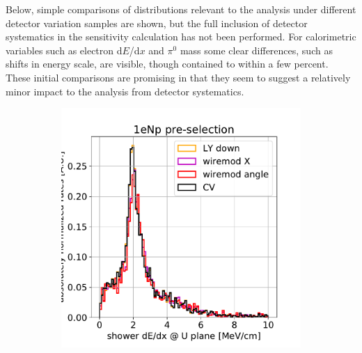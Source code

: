 \documentclass[a4paper]{article}
\begin{document}
\par Below, simple comparisons of distributions relevant to the analysis under different detector variation samples are shown, but the full inclusion of detector systematics in the sensitivity calculation has not been performed. For calorimetric variables such as electron d$E$/d$x$ and $\pi^0$ mass some clear differences, such as shifts in energy scale, are visible, though contained to within a few percent. These initial comparisons are promising in that they seem to suggest a relatively minor impact to the analysis from detector systematics. 

\begin{figure}[H] 
\begin{center}
    \begin{subfigure}[b]{0.3\textwidth}
    \centering
    \includegraphics[width=1.00\textwidth]{detsys/shr_tkfit_dedx_U01162020_eLEE_low.pdf}
    \end{subfigure}
    \begin{subfigure}[b]{0.3\textwidth}
    \centering

\end{subfigure}
\end{center}
\end{figure}
\end{document}
